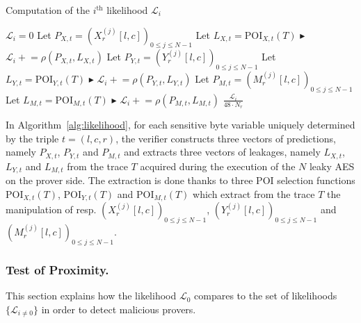 \begin{algorithm}[ht!]
	\caption{Computation of the $i^{\text{th}}$ likelihood $\mathcal{L}_i$}\label{alg:likelihood}
	\begin{algorithmic}[1]
	\State $\mathcal{L}_i  = 0$
   			\State Let $P_{X,t} = (X_r^{(j)}[l,c])_{0\leq j \leq N-1}$
			  \State Let $L_{X,t} = \mbox{POI}_{X,t}(T)$
   			\State $\blacktriangleright$ $\mathcal{L}_i \mathrel{+}= \rho(P_{X,t}, L_{X,t})$ 
   			\State Let $P_{Y,t} = (Y_r^{(j)}[l,c])_{0\leq j \leq N-1}$   						
        \State Let $L_{Y,t} = \mbox{POI}_{Y,t}(T)$
   			\State $\blacktriangleright$ $\mathcal{L}_i \mathrel{+}= \rho(P_{Y,t}, L_{Y,t})$
			  \State Let $P_{M,t} = (M_r^{(j)}[l,c])_{0\leq j \leq N-1}$   			
   			\State Let $L_{M,t} = \mbox{POI}_{M,t}(T)$
   			\State $\blacktriangleright$ $\mathcal{L}_i \mathrel{+}= \rho(P_{M,t}, L_{M,t})$
    \EndFor
	\State \Return $\frac{\mathcal{L}_i}{48\cdot N_r}$ 
  	\end{algorithmic}
\end{algorithm}

In Algorithm~\ref{alg:likelihood}, for each sensitive byte variable uniquely determined by the triple $t=(l,c,r)$, the verifier constructs three vectors of predictions, namely $P_{X,t}$, $P_{Y,t}$ and $P_{M,t}$ and extracts three vectors of leakages, namely $L_{X,t}$, $L_{Y,t}$ and $L_{M,t}$ from the trace $T$ acquired during the execution of the $N$ leaky AES on the prover side. The extraction is done thanks to three POI selection functions $\mbox{POI}_{X,t}(T)$, $\mbox{POI}_{Y,t}(T)$ and $\mbox{POI}_{M,t}(T)$ which extract from the trace $T$ the manipulation of resp. $(X_r^{(j)}[l,c])_{0\leq j \leq N-1}$, $(Y_r^{(j)}[l,c])_{0\leq j \leq N-1}$ and $(M_r^{(j)}[l,c])_{0\leq j \leq N-1}$.

\subsubsection{Test of Proximity.}\label{sssec:proxTest}
This section explains how the likelihood \(\mathcal{L}_0\) compares to the set of likelihoods \(\{\mathcal{L}_{i\not={0}}\}\) in order to detect malicious provers. 

